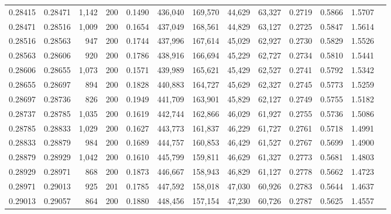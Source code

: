 \begin{tabular}{rrrrrrrrrrrrr}
0.28415 & 0.28471 & 1,142 & 200 &                                     0.1490 & 436,040 & 169,570 &  44,629 &  63,327 & 0.2719 & 0.5866 & 1.5707 \\
0.28471 & 0.28516 & 1,009 & 200 &                                     0.1654 & 437,049 & 168,561 &  44,829 &  63,127 & 0.2725 & 0.5847 & 1.5614 \\
0.28516 & 0.28563 &   947 & 200 &                                     0.1744 & 437,996 & 167,614 &  45,029 &  62,927 & 0.2730 & 0.5829 & 1.5526 \\
0.28563 & 0.28606 &   920 & 200 &                                     0.1786 & 438,916 & 166,694 &  45,229 &  62,727 & 0.2734 & 0.5810 & 1.5441 \\
0.28606 & 0.28655 & 1,073 & 200 &                                     0.1571 & 439,989 & 165,621 &  45,429 &  62,527 & 0.2741 & 0.5792 & 1.5342 \\
0.28655 & 0.28697 &   894 & 200 &                                     0.1828 & 440,883 & 164,727 &  45,629 &  62,327 & 0.2745 & 0.5773 & 1.5259 \\
0.28697 & 0.28736 &   826 & 200 &                                     0.1949 & 441,709 & 163,901 &  45,829 &  62,127 & 0.2749 & 0.5755 & 1.5182 \\
0.28737 & 0.28785 & 1,035 & 200 &                                     0.1619 & 442,744 & 162,866 &  46,029 &  61,927 & 0.2755 & 0.5736 & 1.5086 \\
0.28785 & 0.28833 & 1,029 & 200 &                                     0.1627 & 443,773 & 161,837 &  46,229 &  61,727 & 0.2761 & 0.5718 & 1.4991 \\
0.28833 & 0.28879 &   984 & 200 &                                     0.1689 & 444,757 & 160,853 &  46,429 &  61,527 & 0.2767 & 0.5699 & 1.4900 \\
0.28879 & 0.28929 & 1,042 & 200 &                                     0.1610 & 445,799 & 159,811 &  46,629 &  61,327 & 0.2773 & 0.5681 & 1.4803 \\
0.28929 & 0.28971 &   868 & 200 &                                     0.1873 & 446,667 & 158,943 &  46,829 &  61,127 & 0.2778 & 0.5662 & 1.4723 \\
0.28971 & 0.29013 &   925 & 201 &                                     0.1785 & 447,592 & 158,018 &  47,030 &  60,926 & 0.2783 & 0.5644 & 1.4637 \\
0.29013 & 0.29057 &   864 & 200 &                                     0.1880 & 448,456 & 157,154 &  47,230 &  60,726 & 0.2787 & 0.5625 & 1.4557 \\

\end{tabular}

